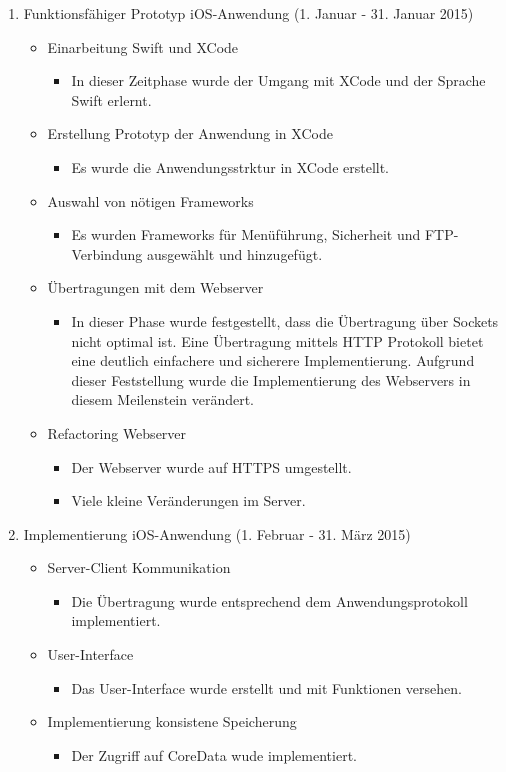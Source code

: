 \begin{enumerate}
\item Funktionsfähiger Prototyp iOS-Anwendung (1. Januar - 31. Januar 2015)
\begin{itemize}
\item Einarbeitung Swift und XCode
\begin{itemize}
\item In dieser Zeitphase wurde der Umgang mit XCode und der Sprache Swift erlernt. 
\end{itemize}
\item Erstellung Prototyp der Anwendung in XCode
\begin{itemize}
\item Es wurde die Anwendungsstrktur in XCode erstellt. 
\end{itemize}
\item Auswahl von nötigen Frameworks
\begin{itemize}
\item Es wurden Frameworks für Menüführung, Sicherheit und FTP-Verbindung ausgewählt und hinzugefügt. 
\end{itemize}
\item Übertragungen mit dem Webserver
\begin{itemize}
\item In dieser Phase wurde festgestellt, dass die Übertragung über Sockets nicht optimal ist. Eine Übertragung mittels HTTP Protokoll bietet eine deutlich einfachere und sicherere Implementierung. Aufgrund dieser Feststellung wurde die Implementierung des Webservers in diesem Meilenstein verändert. 
\end{itemize}
\item Refactoring Webserver
\begin{itemize}
\item Der Webserver wurde auf HTTPS umgestellt. 
\item Viele kleine Veränderungen im Server.
\end{itemize}
\end{itemize}

\item Implementierung iOS-Anwendung (1. Februar - 31. März 2015)
\begin{itemize}
\item Server-Client Kommunikation
\begin{itemize}
\item Die Übertragung wurde entsprechend dem Anwendungsprotokoll implementiert. 
\end{itemize}
\item User-Interface
\begin{itemize}
\item Das User-Interface wurde erstellt und mit Funktionen versehen. 
\end{itemize}
\item Implementierung konsistene Speicherung
\begin{itemize}
\item Der Zugriff auf CoreData wude implementiert.
\end{itemize}
\end{itemize}


\end{enumerate}
